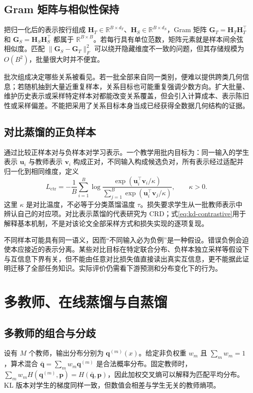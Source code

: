 \documentclass[UTF8,12pt,a4paper,fontset=fandol]{ctexart}
\begin{document}
\subsection{Gram 矩阵与相似性保持}
把归一化后的表示按行组成 $\mathbf H_T\in\mathbb R^{B\times d_T}$、$\mathbf H_S\in\mathbb R^{B\times d_S}$，Gram 矩阵 $\mathbf G_T=\mathbf H_T\mathbf H_T^\top$ 和 $\mathbf G_S=\mathbf H_S\mathbf H_S^\top$ 都属于 $\mathbb R^{B\times B}$。若每行具有单位范数，矩阵元素就是样本间余弦相似度。匹配 $\|\mathbf G_S-\mathbf G_T\|_F^2$ 可以绕开隐藏维度不一致的问题，但其存储规模为 $O(B^2)$，批量很大时并不便宜。

批次组成决定哪些关系被看见。若一批全部来自同一类别，便难以提供跨类几何信息；若随机抽到大量近重复样本，关系目标也可能重复强调少数方向。扩大批量、维护历史表示或采样特定样本对都能改变关系覆盖，但会引入计算成本、表示陈旧性或采样偏差。不能把采用了关系目标本身当成已经获得全数据几何结构的证据。

\subsection{对比蒸馏的正负样本}
通过比较正样本对与负样本对学习表示。一个教学用批内目标为：同一输入的学生表示 $\mathbf u_i$ 与教师表示 $\mathbf v_i$ 构成正对，不同输入构成候选负对，所有表示经过适配并归一化到相同维度，定义
\begin{equation}
 L_{\mathrm{ctr}}=-\frac1B\sum_{i=1}^B
 \log\frac{\exp(\mathbf u_i^\top\mathbf v_i/\kappa)}
 {\sum_{j=1}^B\exp(\mathbf u_i^\top\mathbf v_j/\kappa)},\qquad \kappa>0.
 \label{eq:kd-contrastive}
\end{equation}
这里 $\kappa$ 是对比温度，不必等于分类蒸馏温度 $\tau$。损失要求学生从一批教师表示中辨认自己的对应项。对比表示蒸馏的代表研究为 CRD\cite{tian2020}；式\eqref{eq:kd-contrastive}用于解释基本机制，不是对该论文全部采样方式和损失实现的逐项复现。

不同样本可能具有同一语义，因而“不同输入必为负例”是一种假设。错误负例会迫使本应接近的表示分离。某些对比目标在特定联合分布、负样本独立采样等假设下与互信息下界有关，但不能由任意对比损失值直接读出真实互信息，更不能据此证明迁移了全部任务知识。实际评价仍需看下游预测和分布变化下的行为。

\section{多教师、在线蒸馏与自蒸馏}
\label{sec:kd-training-schemes}

\subsection{多教师的组合与分歧}
设有 $M$ 个教师，输出分布分别为 $\mathbf q^{(m)}(x)$。给定非负权重 $w_m$ 且 $\sum_mw_m=1$，算术混合 $\bar{\mathbf q}=\sum_mw_m\mathbf q^{(m)}$ 是合法概率分布。固定教师时，$\sum_mw_mH(\mathbf q^{(m)},\mathbf p)=H(\bar{\mathbf q},\mathbf p)$，因此加权交叉熵可以解释为匹配平均分布。KL 版本对学生的梯度同样一致，但数值会相差与学生无关的教师熵项。
\end{document}
